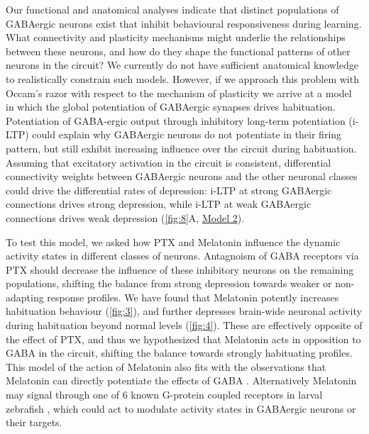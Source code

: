 \documentclass[9pt,lineno]{RandlettLab_elife}
\begin{document}
\begin{figure}
\begin{fullwidth}
\begin{center}
\label{fig:S8}
\end{center}
\end{fullwidth}
\end{figure}


Our functional and anatomical analyses indicate that distinct populations of GABAergic neurons exist that inhibit behavioural responsiveness during learning. What connectivity and plasticity mechanisms might underlie the relationships between these neurons, and how do they shape the functional patterns of other neurons in the circuit? We currently do not have sufficient anatomical knowledge to realistically constrain such models. However, if we approach this problem with Occam's razor with respect to the mechanism of plasticity we arrive at a model in which the global potentiation of GABAergic synapses drives habituation. Potentiation of GABA-ergic output through inhibitory long-term potentiation (i-LTP) could explain why GABAergic neurons do not potentiate in their firing pattern, but still exhibit increasing influence over the circuit during habituation. Assuming that excitatory activation in the circuit is consistent, differential connectivity weights between GABAergic neurons and the other neuronal classes could drive the differential rates of depression: i-LTP at strong GABAergic connections drives strong depression, while i-LTP at weak GABAergic connections drives weak depression (\autoref{fig:8}A, \underline{Model 2}). 

To test this model, we asked how PTX and Melatonin influence the dynamic activity states in different classes of neurons. Antagnoism of GABA receptors via PTX should decrease the influence of these inhibitory neurons on the remaining populations, shifting the balance from strong depression towards weaker or non-adapting response profiles. We have found that Melatonin potently increases habituation behaviour (\autoref{fig:3}), and further depresses brain-wide neuronal activity during habituation beyond normal levels (\autoref{fig:4}). These are effectively opposite of the effect of PTX, and thus we hypothesized that Melatonin acts in opposition to GABA in the circuit, shifting the balance towards strongly habituating profiles. This model of the action of Melatonin also fits with the observations that Melatonin can directly potentiate the effects of GABA \cite{Cheng2012-gv, Niles1987-oc}. Alternatively Melatonin may signal through one of 6 known G-protein coupled receptors in larval zebrafish \cite{Maugars2020-pz}, which could act to modulate activity states in GABAergic neurons or their targets. 
\end{document}
